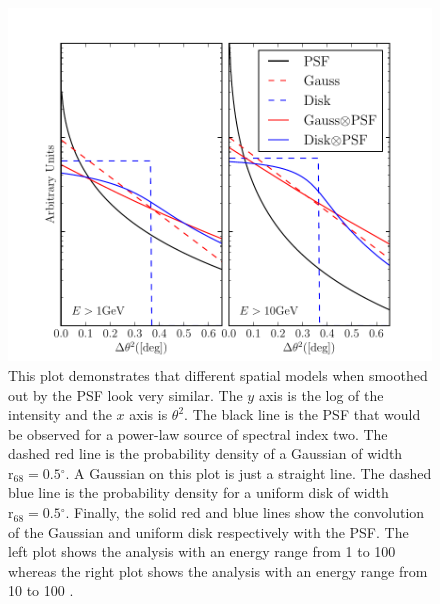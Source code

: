 \documentclass[12pt,preprint]{aastex}
\newcommand{\gev}{\text{GeV}\xspace}
\newcommand{\rsixeight}{{\ensuremath{\text{r}_{68}}}\xspace}
\renewcommand{\deg}{\ensuremath{^\circ}\xspace}
\begin{document}
  \begin{figure}
    \begin{center}
      \includegraphics{mc_plots/compare_disk_gauss.pdf}
    \end{center}
    \caption{
    This plot demonstrates that different spatial models when smoothed
    out by the PSF look very similar.  The $y$ axis is the log of the
    intensity and the $x$ axis is $\theta^2$.  The black line is the
    PSF that would be observed for a power-law source of spectral index
    two. The dashed red line is the probability density of a Gaussian
    of width $\rsixeight=0.5\deg$. A Gaussian on this plot is just a
    straight line.  The dashed blue line is the probability density for
    a uniform disk of width $\rsixeight=0.5\deg$.  Finally, the solid
    red and blue lines show the convolution of the Gaussian and uniform
    disk respectively with the PSF.  The left plot shows the analysis
    with an energy range from 1 \gev to 100 \gev whereas the right plot
    shows the analysis with an energy range from 10 \gev to 100 \gev.
    }\label{compare_disk_gauss}
  \end{figure}
\end{document}
